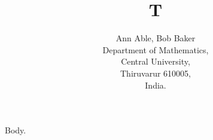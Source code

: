 \documentclass{article}
\begin{document}
\title{T}
\author{Ann Able, Bob Baker\\
{\small Department of Mathematics,\\ Central University,\\ Thiruvarur 610005,\\ India.}}
\maketitle
Body.
\end{document}
